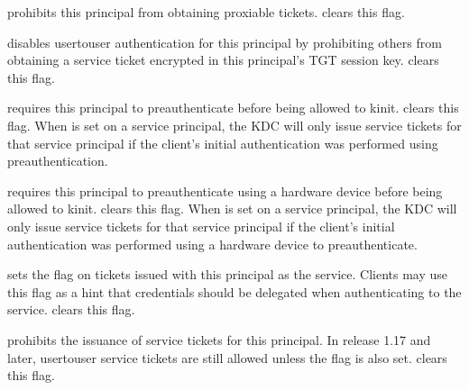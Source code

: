\documentclass[letterpaper,10pt,english]{sphinxmanual}
\begin{document}
\begin{description}
\sphinxAtStartPar
{} prohibits this principal from obtaining
proxiable tickets.   clears this flag.

\sphinxAtStartPar
{} disables user\sphinxhyphen{}to\sphinxhyphen{}user authentication for this
principal by prohibiting others from obtaining a service ticket
encrypted in this principal’s TGT session key.
 clears this flag.

\sphinxAtStartPar
{} requires this principal to preauthenticate
before being allowed to kinit.   clears this
flag.  When  is set on a service principal,
the KDC will only issue service tickets for that service principal
if the client’s initial authentication was performed using
preauthentication.

\sphinxAtStartPar
{} requires this principal to preauthenticate
using a hardware device before being allowed to kinit.
 clears this flag.  When  is
set on a service principal, the KDC will only issue service tickets
for that service principal if the client’s initial authentication was
performed using a hardware device to preauthenticate.

\sphinxAtStartPar
{} sets the  flag on tickets
issued with this principal as the service.  Clients may use this
flag as a hint that credentials should be delegated when
authenticating to the service.   clears this
flag.

\sphinxAtStartPar
{} prohibits the issuance of service tickets for this
principal.  In release 1.17 and later, user\sphinxhyphen{}to\sphinxhyphen{}user service
tickets are still allowed unless the  flag is
also set.   clears this flag.


\end{description}
\end{document}

